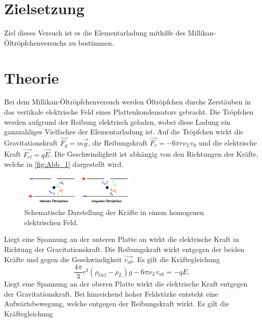 \section{Zielsetzung}
\label{sec:Zielsetzung}
Ziel dieses Versuch ist es die Elementarladung mithilfe des Millikan-Öltröpfchenversuchs zu bestimmen.
\section{Theorie}
\label{sec:Theorie}
Bei dem Millikan-Öltröpfchenversuch werden Öltröpfchen durchs Zerstäuben in das vertikale
elektrische Feld eines Plattenkondensators gebracht. Die Tröpfchen werden aufgrund der Reibung
elektrisch geladen, wobei diese Ladung ein ganzzahliges Vielfaches der Elementarladung ist.
Auf die Tröpfchen wirkt die Gravitationskraft $\vec{F_g}=m \vec{g}$, die Reibungskraft 
$\vec{F_r} = - 6 \pi r \nu_L v_0$ und die elektrische Kraft $\vec{F_{el}} = q \vec{E}$.
Die Geschwindigkeit ist abhängig von den Richtungen der Kräfte, welche in \autoref{fig:Abb_1} dargestellt wird.
\begin{figure}[H]
    \centering
    \includegraphics[width=0.5\textwidth]{Abbildungen/Abb_1.pdf}
    \caption {Schematische Darstellung der Kräfte in einem homogenen elektrischen Feld\cite[1]{V503}.}
    \label{fig:Abb_1}
\end{figure}
Liegt eine Spannung an der unteren Platte an wirkt die elektrische Kraft in Richtung der Gravitationskraft.
Die Reibungskraft wirkt entgegen der beiden Kräfte und gegen die Geschwindigkeit $\vec{v_{ab}}$.
Es gilt die Kräftegleichung
\begin{equation}
    \frac{4 \pi}{3} r^3 (\rho_{Oel}-\rho_L)g - 6 \pi \nu_L v_{ab} = - q E.
    \label{eqn:vab}
\end{equation}
Liegt eine Spannung an der oberen Platte wirkt die elektrische Kraft entgegen der Gravitationskraft.
Bei hinreichend hoher Feldstärke entsteht eine Aufwärtsbewegung, welche entgegen der Reibungskraft wirkt.
Es gilt die Kräftegleichung
